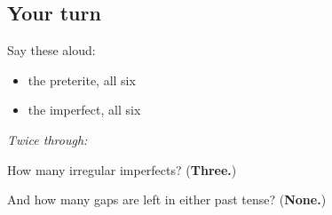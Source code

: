 \subsection*{Your turn}
Say these aloud:

\begin{itemize}
\raggedright
  \item the preterite, all six
  \item the imperfect, all six
\end{itemize}

\emph{Twice through:}

\begin{tcolorbox}[breakable,colback=teal!4,colframe=teal!35!black,title={Before you move on}]
How many irregular imperfects? (\textbf{Three.})

And how many gaps are left in either past tense? (\textbf{None.})
\end{tcolorbox}
